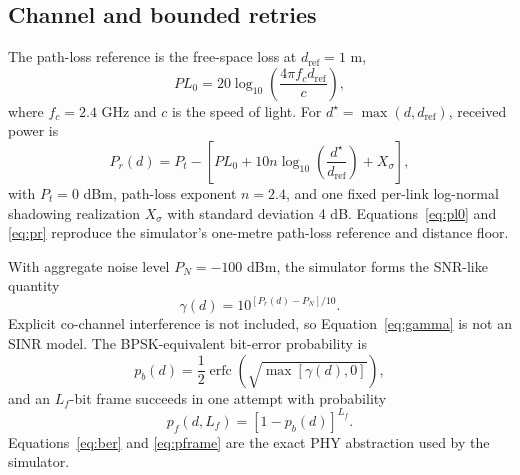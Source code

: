 \documentclass[pdflatex,sn-mathphys-num]{sn-jnl}
\begin{document}
\subsection{Channel and bounded retries}

The path-loss reference is the free-space loss at $d_{\mathrm{ref}}=1$ m,
\begin{equation}
PL_0=20\log_{10}\!\left(\frac{4\pi f_c d_{\mathrm{ref}}}{c}\right),
\label{eq:pl0}
\end{equation}
where $f_c=2.4$ GHz and $c$ is the speed of light. For $d^{\star}=\max(d,d_{\mathrm{ref}})$, received power is
\begin{equation}
P_r(d)=P_t-\left[PL_0+10n\log_{10}\!\left(\frac{d^{\star}}{d_{\mathrm{ref}}}\right)+X_\sigma\right],
\label{eq:pr}
\end{equation}
with $P_t=0$ dBm, path-loss exponent $n=2.4$, and one fixed per-link log-normal shadowing realization $X_\sigma$ with standard deviation 4 dB. Equations~\eqref{eq:pl0} and \eqref{eq:pr} reproduce the simulator's one-metre path-loss reference and distance floor.

With aggregate noise level $P_N=-100$ dBm, the simulator forms the SNR-like quantity
\begin{equation}
\gamma(d)=10^{[P_r(d)-P_N]/10}.
\label{eq:gamma}
\end{equation}
Explicit co-channel interference is not included, so Equation~\eqref{eq:gamma} is not an SINR model. The BPSK-equivalent bit-error probability is
\begin{equation}
p_b(d)=\frac{1}{2}\operatorname{erfc}\!\left(\sqrt{\max[\gamma(d),0]}\right),
\label{eq:ber}
\end{equation}
and an $L_f$-bit frame succeeds in one attempt with probability
\begin{equation}
p_f(d,L_f)=[1-p_b(d)]^{L_f}.
\label{eq:pframe}
\end{equation}
Equations~\eqref{eq:ber} and \eqref{eq:pframe} are the exact PHY abstraction used by the simulator.
\end{document}
